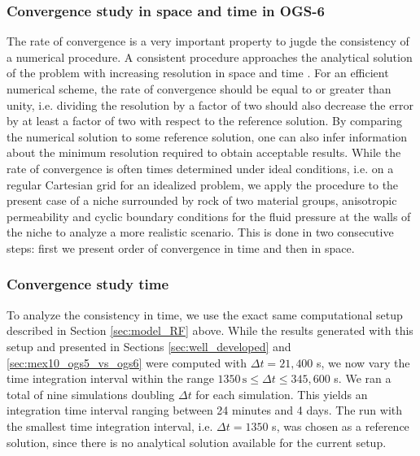 \subsubsection{Convergence study in space and time in OGS-6}
The rate of convergence is a very important property to jugde the consistency of a numerical procedure. A consistent procedure approaches the analytical solution of the problem with increasing resolution in space and time \cite{ferziger2012}.  For an efficient numerical scheme, the rate of convergence should be equal to or greater than unity, i.e. dividing the resolution by a factor of two should also decrease the error by at least a factor of two with respect to the reference solution. By comparing the numerical solution to some reference solution, one can also infer information about the minimum resolution required to obtain acceptable results. While the rate of convergence is often times determined under ideal conditions, i.e. on a regular Cartesian grid for an idealized problem, we apply the procedure to the present case of a niche surrounded by rock of two material groups, anisotropic permeability and cyclic boundary conditions for the fluid pressure at the walls of the niche to analyze a more realistic scenario. This is done in two consecutive steps: first we present order of convergence in time and then in space. 

\subsubsection*{Convergence study time}
To analyze the consistency in time, we use the exact same computational setup described in Section \ref{sec:model_RF} above. While the results generated with this setup and presented in Sections \ref{sec:well_developed} and \ref{sec:mex10_ogs5_vs_ogs6} were computed with $\Delta t = 21,400$ s, we now vary the time integration interval within the range $1350 \, \text{s} \leq \Delta t  \leq 345,600$ s. We ran a total of nine simulations doubling $\Delta t$ for each simulation. This yields an integration time interval ranging between 24 minutes and 4 days. The run with the smallest time integration interval, i.e. $\Delta t = 1350$ s, was chosen as a reference solution, since there is no analytical solution available for the current setup.

